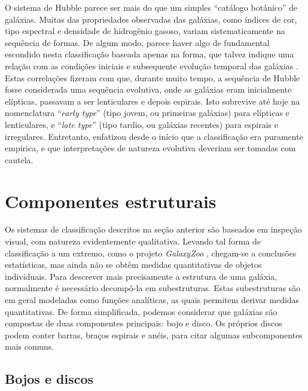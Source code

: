 O sistema de Hubble parece ser mais do que um simples ``catálogo botânico'' de
galáxias. Muitas das propriedades observadas das galáxias, como índices de cor,
tipo espectral e densidade de hidrogênio gasoso, variam sistematicamente na
sequência de formas. De algum modo, parece haver algo de fundamental escondido
nesta classificação baseada apenas na forma, que talvez indique uma relação com
as condições iniciais e subsequente evolução temporal das galáxias
\citep{Sandage1975}. Estas correlações fizeram com que, durante muito tempo, a
sequência de Hubble fosse considerada uma sequência evolutiva, onde as galáxias
eram inicialmente elípticas, passavam a ser lenticulares e depois espirais. Isto
sobrevive até hoje na nomenclatura ``{\em early type}'' (tipo jovem, ou
primeiras galáxias) para elípticas e lenticulares, e ``{\em late type}'' (tipo
tardio, ou galáxias recentes) para espirais e irregulares. Entretanto,
\citet{Hubble1927} enfatizou desde o início que a classificação era puramente
empírica, e que interpretações de natureza evolutiva deveriam ser tomadas com
cautela.



\section{Componentes estruturais}

Os sistemas de classificação descritos na seção anterior são baseados em
inspeção visual, com natureza evidentemente qualitativa. Levando tal forma de
classificação a um extremo, como o projeto {\em GalaxyZoo} \citep{Lintott2008,
Willett2013}, chegam-se a conclusões estatísticas, mas ainda não se obtêm
medidas quantitativas de objetos individuais. Para descrever mais precisamente a
estrutura de uma galáxia, normalmente é necessário decompô-la em subestruturas.
Estas subestruturas são em geral modeladas como funções analíticas, as quais
permitem derivar medidas quantitativas. De forma simplificada, podemos
considerar que galáxias são compostas de duas componentes principais: bojo e
disco. Os próprios discos podem conter barras, braços espirais e anéis, para
citar algumas subcomponentes mais comuns.


\subsection{Bojos e discos}
\label{sec:morph:comp:bd}

